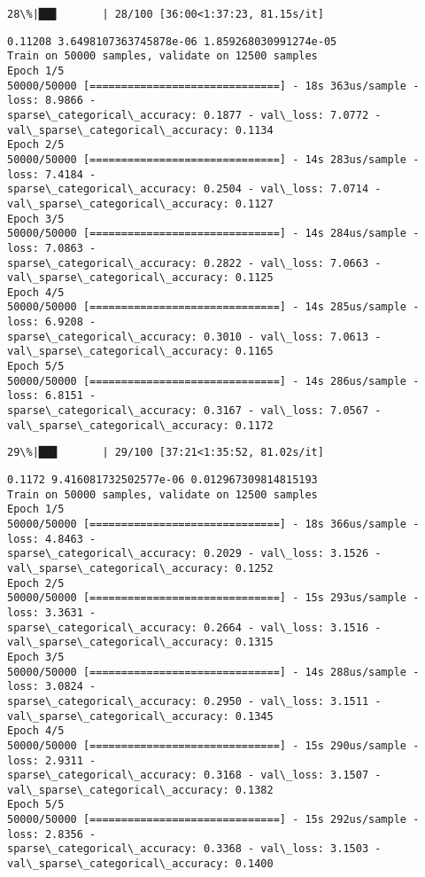 \documentclass[11pt]{article}
\begin{document}
    \begin{Verbatim}[commandchars=\\\{\}]
 28\%|██▊       | 28/100 [36:00<1:37:23, 81.15s/it]
    \end{Verbatim}

    \begin{Verbatim}[commandchars=\\\{\}]
0.11208 3.6498107363745878e-06 1.859268030991274e-05
Train on 50000 samples, validate on 12500 samples
Epoch 1/5
50000/50000 [==============================] - 18s 363us/sample - loss: 8.9866 -
sparse\_categorical\_accuracy: 0.1877 - val\_loss: 7.0772 -
val\_sparse\_categorical\_accuracy: 0.1134
Epoch 2/5
50000/50000 [==============================] - 14s 283us/sample - loss: 7.4184 -
sparse\_categorical\_accuracy: 0.2504 - val\_loss: 7.0714 -
val\_sparse\_categorical\_accuracy: 0.1127
Epoch 3/5
50000/50000 [==============================] - 14s 284us/sample - loss: 7.0863 -
sparse\_categorical\_accuracy: 0.2822 - val\_loss: 7.0663 -
val\_sparse\_categorical\_accuracy: 0.1125
Epoch 4/5
50000/50000 [==============================] - 14s 285us/sample - loss: 6.9208 -
sparse\_categorical\_accuracy: 0.3010 - val\_loss: 7.0613 -
val\_sparse\_categorical\_accuracy: 0.1165
Epoch 5/5
50000/50000 [==============================] - 14s 286us/sample - loss: 6.8151 -
sparse\_categorical\_accuracy: 0.3167 - val\_loss: 7.0567 -
val\_sparse\_categorical\_accuracy: 0.1172
    \end{Verbatim}

    \begin{Verbatim}[commandchars=\\\{\}]
 29\%|██▉       | 29/100 [37:21<1:35:52, 81.02s/it]
    \end{Verbatim}

    \begin{Verbatim}[commandchars=\\\{\}]
0.1172 9.416081732502577e-06 0.012967309814815193
Train on 50000 samples, validate on 12500 samples
Epoch 1/5
50000/50000 [==============================] - 18s 366us/sample - loss: 4.8463 -
sparse\_categorical\_accuracy: 0.2029 - val\_loss: 3.1526 -
val\_sparse\_categorical\_accuracy: 0.1252
Epoch 2/5
50000/50000 [==============================] - 15s 293us/sample - loss: 3.3631 -
sparse\_categorical\_accuracy: 0.2664 - val\_loss: 3.1516 -
val\_sparse\_categorical\_accuracy: 0.1315
Epoch 3/5
50000/50000 [==============================] - 14s 288us/sample - loss: 3.0824 -
sparse\_categorical\_accuracy: 0.2950 - val\_loss: 3.1511 -
val\_sparse\_categorical\_accuracy: 0.1345
Epoch 4/5
50000/50000 [==============================] - 15s 290us/sample - loss: 2.9311 -
sparse\_categorical\_accuracy: 0.3168 - val\_loss: 3.1507 -
val\_sparse\_categorical\_accuracy: 0.1382
Epoch 5/5
50000/50000 [==============================] - 15s 292us/sample - loss: 2.8356 -
sparse\_categorical\_accuracy: 0.3368 - val\_loss: 3.1503 -
val\_sparse\_categorical\_accuracy: 0.1400
    \end{Verbatim}
\end{document}
